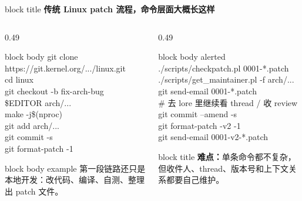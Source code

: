 \documentclass[aspectratio=169,professionalfonts]{beamer}
\newcommand{\sectiontitle}[1]{
  \begin{beamercolorbox}[wd=\linewidth,sep=0.7em,rounded=true]{block title}
    \usebeamerfont*{frametitle}\Large\bfseries #1
  \end{beamercolorbox}
  \vspace{0.4em}
}
\begin{document}
\begin{frame}[fragile]
  \sectiontitle{传统 Linux patch 流程，命令层面大概长这样}
  \scriptsize
  \begin{columns}[T,totalwidth=\textwidth]
    \begin{column}{0.49\textwidth}
      \begin{beamercolorbox}[wd=\linewidth,sep=0.75em,rounded=true]{block body}
{\ttfamily
git clone https://git.kernel.org/.../linux.git\\
cd linux\\
git checkout -b fix-arch-bug\\
\$EDITOR arch/...\\
make -j\$(nproc)\\
git add arch/...\\
git commit -s\\
git format-patch -1
}
      \end{beamercolorbox}
      \vspace{0.45em}
      \begin{beamercolorbox}[wd=\linewidth,sep=0.7em,rounded=true]{block body example}
        第一段链路还只是本地开发：改代码、编译、自测、整理出 patch 文件。
      \end{beamercolorbox}
    \end{column}
    \begin{column}{0.49\textwidth}
      \begin{beamercolorbox}[wd=\linewidth,sep=0.75em,rounded=true]{block body alerted}
{\ttfamily
./scripts/checkpatch.pl 0001-*.patch\\
./scripts/get\_maintainer.pl -f arch/...\\
git send-email 0001-*.patch\\
\# 去 lore 里继续看 thread / 收 review\\
git commit --amend -s\\
git format-patch -v2 -1\\
git send-email 0001-v2-*.patch
}
      \end{beamercolorbox}
      \vspace{0.45em}
      \begin{beamercolorbox}[wd=\linewidth,sep=0.7em,rounded=true]{block title}
        \textbf{难点：}单条命令都不复杂，但收件人、thread、版本号和上下文关系都要自己维护。
      \end{beamercolorbox}
    \end{column}
  \end{columns}
\end{frame}
\end{document}
